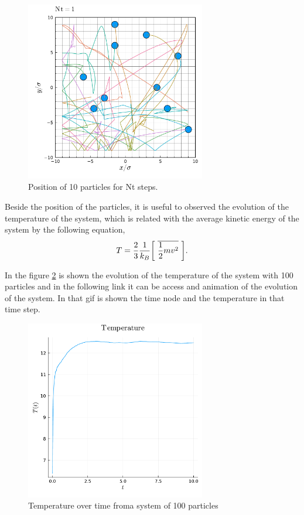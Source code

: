 \documentclass[main.tex]{subfiles}
\begin{document}
\begin{figure}[ht!]
    \centering
    \includegraphics[width=0.7\textwidth]{imgs/hw1/10PartPosition.pdf}
    \caption{Position of 10 particles for Nt steps.}
    \label{fig:10PartPlot}
\end{figure}


Beside the position of the particles, it is useful to observed the evolution of the temperature of the system, which is related with the average kinetic energy of the system by the following equation,
\begin{gather}
    T = \frac{2}{3}\frac{1}{k_{B}}\qty[~\overline{\frac{1}{2}mv^{2}}~]\label{eqn:Temperature}.
\end{gather}

In the figure \ref{fig:temp100PArt} is shown the evolution of the temperature of the system with 100 particles and in the following link \href{https://tecmx-my.sharepoint.com/:i:/g/personal/a00827546_tec_mx/EcEmhXA6lAhGnkAhsRE2kuUBhrXytAb75rOMnJR9yHd_0g?e=JAt8PD}{\color{blue}{Link to the animation}} it can be access and animation of the evolution of the system.
In that gif is shown the time node and the temperature in that time step.

\begin{figure}[ht!]
    \centering
    \includegraphics[width=0.7\textwidth]{imgs/hw1/100TempPlot.pdf}
    \caption{Temperature over time froma system of 100 particles}
    \label{fig:temp100PArt}
\end{figure}
\end{document}
